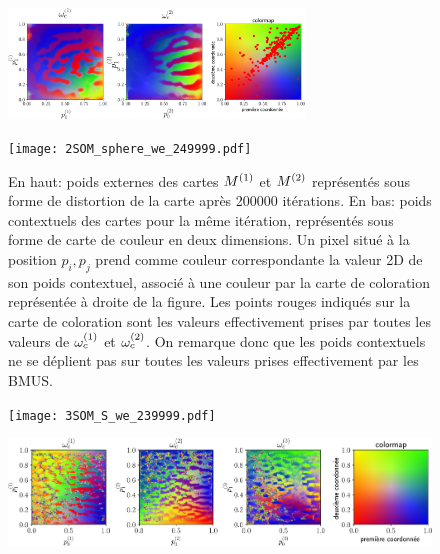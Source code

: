 \documentclass[../main]{subfiles}
\begin{document}
\begin{figure}
	\begin{minipage}{\textwidth}
		\centering\includegraphics[width=0.7\textwidth]{2SOM_sphere_wc_249999.pdf}
		\label{fig:2som_s_we}
	\end{minipage}
	\begin{minipage}{\textwidth}
		\texttt{[image: 2SOM\_sphere\_we\_249999.pdf]}
		\caption{En haut: poids externes des cartes $M^{({1})}$ et $M^{({2})}$ représentés sous forme de distortion de la carte après 200000 itérations.
		En bas: poids contextuels des cartes pour la même itération, représentés sous forme de carte de couleur en deux dimensions. Un pixel situé à la position $p_i,p_j$ prend comme couleur correspondante la valeur 2D de son poids contextuel, associé à une couleur par la carte de coloration représentée à droite de la figure.
		Les points rouges indiqués sur la carte de coloration sont les valeurs effectivement prises par toutes les valeurs de $\omega_c^{(1)}$ et $\omega_c^{(2)}$. On remarque donc que les poids contextuels ne se déplient pas sur toutes les valeurs prises effectivement par les BMUS.
		\label{fig:2som_s_wc}}
	\end{minipage}
\end{figure}


\begin{figure}
	\begin{minipage}{\textwidth}
		\centering\texttt{[image: 3SOM\_S\_we\_239999.pdf]}
	\end{minipage}
	\begin{minipage}{\textwidth}
		\includegraphics[width=\textwidth]{3SOM_S_wc_239999.pdf}
		\caption{}
	\end{minipage}
\end{figure}
\end{document}
